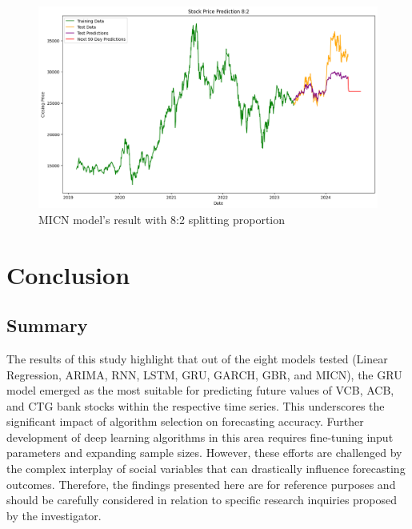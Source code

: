 \documentclass{ieeeojies}
\begin{document}
\begin{figure}[H]
  \centering
  \begin{minipage}{0.8\linewidth}
    \centering
    \includegraphics[width=\linewidth]{bibliography/CTG-MICN-8-2.png}
    \caption{MICN model's result with 8:2 splitting proportion}
    \label{fig26}
  \end{minipage}
\end{figure}

\section{Conclusion}
\subsection{Summary}
The results of this study highlight that out of the eight models tested (Linear Regression, ARIMA, RNN, LSTM, GRU, GARCH, GBR, and MICN), the GRU model emerged as the most suitable for predicting future values of VCB, ACB, and CTG bank stocks within the respective time series. This underscores the significant impact of algorithm selection on forecasting accuracy. Further development of deep learning algorithms in this area requires fine-tuning input parameters and expanding sample sizes. However, these efforts are challenged by the complex interplay of social variables that can drastically influence forecasting outcomes. Therefore, the findings presented here are for reference purposes and should be carefully considered in relation to specific research inquiries proposed by the investigator.
\end{document}
